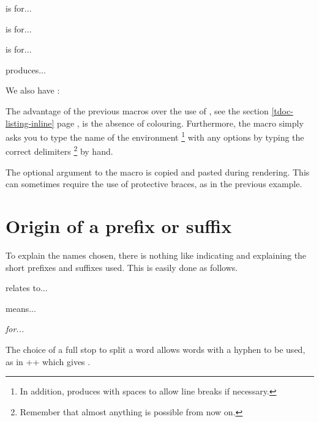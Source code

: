 \begin{tdoclatex}[sbs]
 is for...

 is for...

 is for...

 produces...

We also have :

\end{tdoclatex}


\begin{tdocrem}
    The advantage of the previous macros over the use of , see the section \ref{tdoc-listing-inline} page \pageref{tdoc-listing-inline}, is the absence of colouring.
    Furthermore, the  macro simply asks you to type the name of the environment
    \footnote{
        In addition,  produces  with spaces to allow line breaks if necessary.
    }
    with any options by typing the correct delimiters
    \footnote{
        Remember that almost anything is possible from now on.
    }
    by hand.
\end{tdocrem}


\begin{tdocwarn}
    The optional argument to the  macro is copied and pasted during rendering. This can sometimes require the use of protective braces, as in the previous example.
\end{tdocwarn}



\section{Origin of a prefix or suffix}

To explain the names chosen, there is nothing like indicating and explaining the short prefixes and suffixes used. This is easily done as follows.


\begin{tdoclatex}[sbs]
 relates to...

 means...

\emph{ for...}
\end{tdoclatex}


\begin{tdocrem}
    The choice of a full stop to split a word allows words with a hyphen to be used, as in \tdocinlatex++ which gives .
\end{tdocrem}


